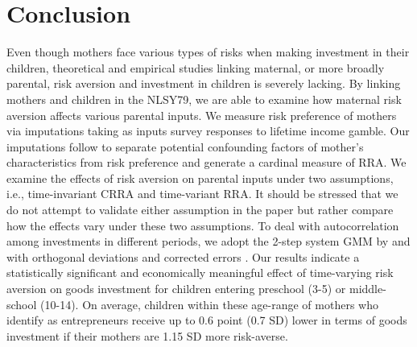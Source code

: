 \documentclass[emulatestandardclasses, 10pt, abstract = true]{scrartcl}
\begin{document}
\section{Conclusion}
Even though mothers face various types of risks when making investment in their children, theoretical and empirical studies linking maternal, or more broadly parental, risk aversion and investment in children is severely lacking. By linking mothers and children in the NLSY79, we are able to examine how maternal risk aversion affects various parental inputs. We measure risk preference of mothers via imputations taking as inputs survey responses to lifetime income gamble. Our imputations follow \citet{kimball2008imputing,kimball2009risk} to separate potential confounding factors of mother's characteristics from risk preference and generate a cardinal measure of RRA. We examine the effects of risk aversion on parental inputs under two assumptions, i.e., time-invariant CRRA and time-variant RRA. It should be stressed that we do not attempt to validate either assumption in the paper but rather compare how the effects vary under these two assumptions. To deal with autocorrelation among investments in different periods, we adopt the 2-step system GMM by \citet{arellano1991some} and \citet{blundell1998initial} with orthogonal deviations \citep{arellano1995another} and corrected errors \citep{windmeijer2005finite}. Our results indicate a statistically significant and economically meaningful effect of time-varying risk aversion on goods investment for children entering preschool (3-5) or middle-school (10-14). On average, children within these age-range of mothers who identify as entrepreneurs receive up to 0.6 point (0.7 SD) lower in terms of goods investment if their mothers are 1.15 SD more risk-averse. 
\end{document}
